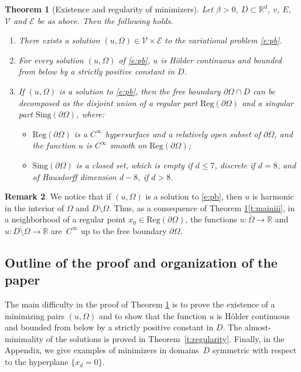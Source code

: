 \documentclass[11pt]{article}
\numberwithin{equation}{section}
\newenvironment{enumeratei}
{\bgroup\def\theenumi{\roman{enumi}}\def\theenumii{\arabic{enumii}}\begin{enumerate}}
{\end{enumerate}\egroup}
\newcommand{\Reg}{\mathrm{Reg}}
\newcommand{\Sing}{\mathrm{Sing}}
\theoremstyle{plain}
\newtheorem{teo}{Theorem}[section]
\theoremstyle{definition}
\newtheorem{oss}[teo]{Remark}
\def\R{\mathbb{R}}
\begin{document}
\begin{teo}[Existence and regularity of minimizers]\label{t:main}
Let $\beta\!>\!0$, $D\!\subset\!\R^d$, $v$, $E$,~$\mathcal V$ and $\mathcal E$ be as above. Then the following holds.

\begin{enumeratei}
\item\label{t:maini} There exists a solution $(u,\Omega)\in\mathcal V\times\mathcal E$ to the variational problem \eqref{e:pb}.
\item For every solution $(u,\Omega)$ of \eqref{e:pb}, $u$ is Hölder continuous and bounded from below by a strictly positive constant in $D$.

\item\label{t:mainii} If $(u,\Omega)$ is a solution to \eqref{e:pb}, then the free boundary $\partial\Omega\cap D$ can be decomposed as the disjoint union of a regular part $\Reg(\partial\Omega)$ and a singular part $\Sing(\partial\Omega)$, where:
\begin{itemize}
\item\label{t:mainiii} $\Reg(\partial\Omega)$ is a $C^{\infty}$ hypersurface and a relatively open subset of $\partial\Omega$, and the function $u$ is $C^\infty$ smooth on $\Reg(\partial\Omega)$;
\item $\Sing(\partial\Omega)$ is a closed set, which is empty if $d\le 7$, discrete if $d=8$, and of Hausdorff dimension $d-8$, if $d>8$.
\end{itemize}
\end{enumeratei}
\end{teo}

\begin{oss}
We notice that if $(u,\Omega)$ is a solution to \eqref{e:pb}, then $u$ is harmonic in the interior of $\Omega$ and $D\setminus\Omega$. Thus, as a consequence of Theorem \ref{t:main}\eqref{t:mainiii}, in a neighborhood of a regular point $x_0\in\Reg(\partial\Omega)$, the functions $u:\overline\Omega\to\R$ and $u:\overline{D\setminus\Omega}\to\R$ are~$C^\infty$ up to the free boundary $\partial\Omega$.
\end{oss}

\subsection{Outline of the proof and organization of the paper}\label{sub:sketch}
The main difficulty in the proof of Theorem \ref{t:main} is to prove the existence of a minimizing pairs $(u,\Omega)$ and to show that the function $u$ is Hölder continuous and bounded from below by a strictly positive constant in $D$. The almost-minimality of the solutions is proved in Theorem~\ref{t:regularity}. Finally, in the Appendix, we give examples of minimizers in domains~$D$ symmetric with respect to the hyperplane $\{x_d=0\}$.
\end{document}
